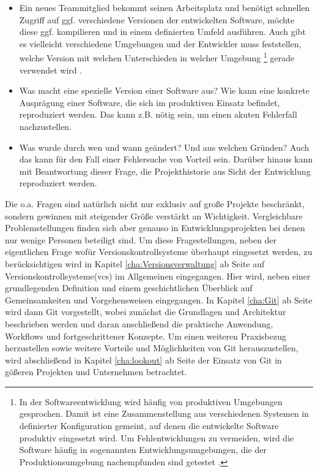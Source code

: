 \begin{itemize}
  \item Ein neues Teammitglied bekommt seinen Arbeitsplatz und ben\"otigt
  schnellen Zugriff auf ggf. verschiedene Versionen der entwickelten Software,
  m\"ochte diese ggf. kompilieren und in einem definierten Umfeld ausf\"uhren.
  Auch gibt es vielleicht verschiedene Umgebungen und der Entwickler muss
  feststellen, welche Version mit welchen Unterschieden in welcher \gls{Umgebung}
  \footnote{\label{umgebung:1}In der Softwareentwicklung wird häufig von
  produktiven Umgebungen gesprochen. Damit ist eine Zusammenstellung aus
  verschiedenen Systemen in definierter Konfiguration gemeint, auf denen die
  entwickelte Software produktiv eingesetzt wird. Um Fehlentwicklungen zu
  vermeiden, wird die Software häufig in sogenannten Entwicklungsumgebungen,
  die der Produktionsumgebung nachempfunden sind getestet \cite[S.~49,
  250]{cd}.} gerade verwendet wird \citep[S.~26]{cd}.
  \item Was macht eine spezielle Version einer Software aus?  Wie kann eine
  konkrete Auspr\"agung einer Software, die sich im produktiven Einsatz
  befindet, reproduziert werden. Das kann z.B. n\"otig sein, um einen akuten
  Fehlerfall nachzustellen\cite[s.~33]{cd}.
  \item Was wurde durch wen und wann ge\"andert? Und aus welchen Gr\"unden?
  Auch das kann f\"ur den Fall einer Fehlersuche von Vorteil sein. Darüber
  hinaus kann mit Beantwortung dieser Frage, die Projekthistorie aus Sicht der
  Entwicklung reproduziert werden\cite[S.~33]{cd}.
\end{itemize}
Die o.a. Fragen sind natürlich nicht nur exklusiv auf große Projekte
beschränkt, sondern gewinnen mit steigender Größe verstärkt an Wichtigkeit.
Vergleichbare Problemstellungen finden sich aber genauso in
Entwicklungsprojekten bei denen nur wenige Personen beteiligt sind. Um diese
Fragestellungen, neben der eigentlichen Frage wofür Versionskontrollsysteme
überhaupt eingesetzt werden, zu berücksichtigen wird in Kapitel
\ref{cha:Versionsverwaltung} ab Seite \pageref{cha:Versionsverwaltung} auf
Versionskontrollsysteme(\acrshort{vcs}) im Allgemeinen eingegangen. Hier wird,
neben einer grundlegenden Definition und einem geschichtlichen Überblick auf
Gemeinsamkeiten und Vorgehensweisen eingegangen. In Kapitel \ref{cha:Git} ab
Seite \pageref{cha:Git} wird dann Git vorgestellt, wobei zunächst die
Grundlagen und Architektur beschrieben werden und daran anschließend die
praktische Anwendung, Workflows und fortgeschrittener Konzepte. Um einen
weiteren Praxisbezug herzustellen sowie weitere Vorteile und Möglichkeiten von
Git herauszustellen, wird abschließend in Kapitel \ref{cha:lookout} ab Seite
\pageref{cha:lookout} der Einsatz von Git in gößeren Projekten und Unternehmen
betrachtet.
